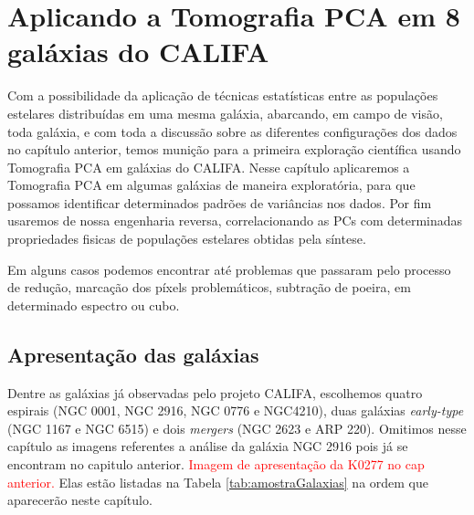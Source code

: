 


\chapter{Aplicando a Tomografia PCA em 8 galáxias do CALIFA}
\label{sec:result}

Com a possibilidade da aplicação de técnicas estatísticas entre as populações estelares distribuídas em uma mesma
galáxia, abarcando, em campo de visão, toda galáxia, e com toda a discussão sobre as diferentes configurações dos dados
no capítulo anterior, temos munição para a primeira exploração científica usando Tomografia PCA em galáxias do CALIFA.
Nesse capítulo aplicaremos a Tomografia PCA em algumas galáxias de maneira exploratória, para que possamos identificar
determinados padrões de variâncias nos dados. Por fim usaremos de nossa engenharia reversa, correlacionando as PCs com
determinadas propriedades fisicas de populações estelares obtidas pela síntese.

\ojo Em alguns casos podemos encontrar até problemas que passaram pelo processo de redução, marcação dos píxels
problemáticos, subtração de poeira, em determinado espectro ou cubo.

\section{Apresentação das galáxias}
\label{sec:result:apres}

Dentre as galáxias já observadas pelo projeto CALIFA, escolhemos quatro espirais (NGC 0001, NGC 2916, NGC 0776 e
NGC4210), duas galáxias {\em early-type} (NGC 1167 e NGC 6515) e dois {\em mergers} (NGC 2623 e ARP 220). Omitimos nesse
capítulo as imagens referentes a análise da galáxia NGC 2916 pois já se encontram no capitulo anterior. \fixme
\textcolor{red}{Imagem de apresentação da K0277 no cap anterior.} Elas estão listadas na Tabela
\ref{tab:amostraGalaxias} na ordem que aparecerão neste capítulo.

